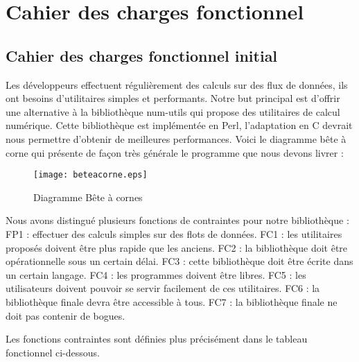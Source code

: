 \chapter{Cahier des charges fonctionnel}

\section{Cahier des charges fonctionnel initial}
Les d\'eveloppeurs effectuent r\'eguli\`erement des calculs sur des flux de donn\'ees, ils ont besoins d'utilitaires simples et performants.
Notre but principal est d'offrir une alternative \`a la biblioth\`eque num-utils qui propose des utilitaires de calcul num\'erique. 
Cette biblioth\`eque est impl\'ement\'ee en Perl, l'adaptation en C devrait nous permettre d'obtenir de meilleures performances.
Voici le diagramme b\^ete \`a corne qui pr\'esente de fa\c con tr\`es g\'en\'erale le programme que nous devons livrer : 

\begin{figure}[h]
\begin{center}
\texttt{[image: beteacorne.eps]}
\end{center}
\caption{Diagramme B\^ete \`a cornes}
\label{fig:numprocess}
\end{figure}

Nous avons distingu\'e plusieurs fonctions de contraintes pour notre biblioth\`eque : 
\newline
FP1 : effectuer des calculs simples sur des flots de donn\'ees.
\newline
FC1 : les utilitaires propos\'es doivent \^etre plus rapide que les anciens.
\newline
FC2 : la biblioth\`eque doit \^etre op\'erationnelle sous un certain d\'elai.
\newline
FC3 : cette biblioth\`eque doit \^etre \'ecrite dans un certain langage.
\newline
FC4 : les programmes doivent \^etre libres.
\newline
FC5 : les utilisateurs doivent pouvoir se servir facilement de ces utilitaires.
\newline
FC6 : la biblioth\`eque finale devra \^etre accessible  \`a tous.
\newline
FC7 : la biblioth\`eque finale ne doit pas contenir de bogues.
\newline


Les fonctions contraintes sont d\'efinies plus pr\'ecis\'ement dans le tableau fonctionnel ci-dessous.

